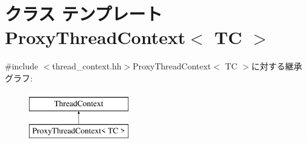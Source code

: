 \hypertarget{classProxyThreadContext}{
\section{クラス テンプレート ProxyThreadContext$<$ TC $>$}
\label{classProxyThreadContext}
}


{\ttfamily \#include $<$thread\_\-context.hh$>$}ProxyThreadContext$<$ TC $>$に対する継承グラフ:\begin{figure}[H]
\begin{center}
\leavevmode
\includegraphics[height=2cm]{classProxyThreadContext}
\end{center}
\end{figure}
